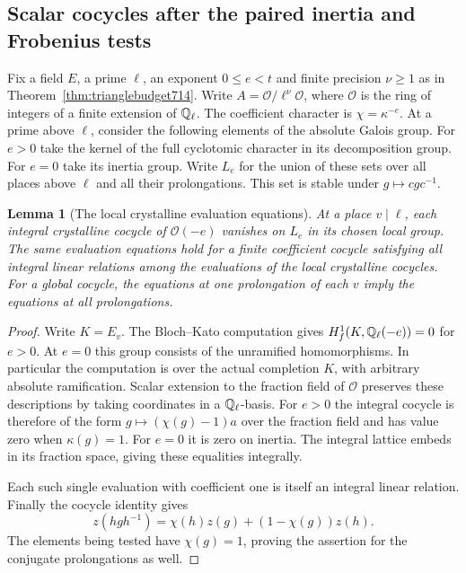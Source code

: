 \documentclass[a4paper,11pt]{article}
\newtheorem{lemma}[proposition]{Lemma}
\theoremstyle{definition}
\theoremstyle{remark}
\numberwithin{equation}{section}
\begin{document}
\subsection{Scalar cocycles after the paired inertia and Frobenius tests}
\label{sec:pairedscalar717}

Fix a field \(E\), a prime \(\ell\), an exponent \(0\le e<t\)
and finite precision \(\nu\ge1\) as in
Theorem~\ref{thm:trianglebudget714}. Write
\(A=\mathcal O/\ell^\nu\mathcal O\), where \(\mathcal O\) is
the ring of integers of a finite extension of \(\mathbb Q_\ell\).
The coefficient character is \(\chi=\kappa^{-e}\).
At a prime above \(\ell\), consider the following elements
of the absolute Galois group. For \(e>0\) take the kernel of
the full cyclotomic character in its decomposition group.
For \(e=0\) take its inertia group. Write \(L_e\) for the
union of these sets over all places above \(\ell\) and all
their prolongations. This set is stable under \(g\mapsto cgc^{-1}\).

\begin{lemma}[The local crystalline evaluation equations]
\leavevmode\label{lem:cryszero717}
At a place \(v\mid\ell\), each integral crystalline cocycle
of \(\mathcal O(-e)\) vanishes on \(L_e\) in its chosen local
group. The same evaluation equations hold for a finite
coefficient cocycle satisfying all integral linear relations
among the evaluations of the local crystalline cocycles.
For a global cocycle, the equations at one prolongation of
each \(v\) imply the equations at all prolongations.
\end{lemma}
\begin{proof}
Write \(K=E_v\). The Bloch--Kato computation gives
\(H^1_f(K,\mathbb Q_\ell(-e))=0\) for \(e>0\). At \(e=0\) this
group consists of the unramified homomorphisms. In particular
the computation is over the actual completion \(K\), with
arbitrary absolute ramification. Scalar extension to the
fraction field of \(\mathcal O\) preserves these descriptions
by taking coordinates in a \(\mathbb Q_\ell\)-basis.
For \(e>0\) the integral cocycle is therefore of the form
\(g\mapsto(\chi(g)-1)a\) over the fraction field and has
value zero when \(\kappa(g)=1\). For \(e=0\) it is zero
on inertia. The integral lattice embeds in its fraction
space, giving these equalities integrally.
~\cite[Corollary~3.8.4 and Example~3.9]{II-II-II-bktate717}

Each such single evaluation with coefficient one is itself
an integral linear relation. Finally the cocycle identity gives
\[
 z(hgh^{-1})=\chi(h)z(g)+(1-\chi(g))z(h).
\]
The elements being tested have \(\chi(g)=1\), proving the
assertion for the conjugate prolongations as well.
\end{proof}
\end{document}
